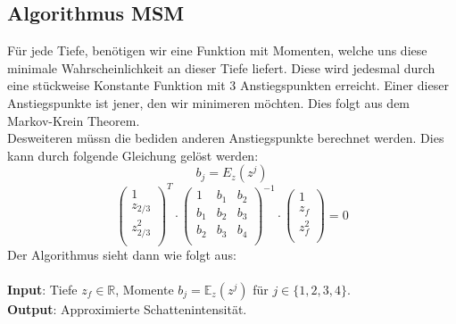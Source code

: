\documentclass[runningheaders,a4paper]{llncs}
\begin{document}
\subsection{Algorithmus MSM}
Für jede Tiefe, benötigen wir eine Funktion mit Momenten, welche uns diese minimale Wahrscheinlichkeit an dieser Tiefe liefert. Diese wird jedesmal durch eine stückweise Konstante Funktion mit 3 Anstiegspunkten erreicht. Einer dieser Anstiegspunkte ist jener, den wir minimeren möchten. Dies folgt aus dem Markov-Krein Theorem.\cite{msm}\\
Desweiteren müssn die bediden anderen Anstiegspunkte berechnet werden. Dies kann durch folgende Gleichung gelöst werden:
$$b_j = E_z(z^j)$$
$$\begin{pmatrix} 
1\\
z_{2/3}\\
z^2_{2/3}\\
\end{pmatrix}^T \cdot 
\begin{pmatrix}
1 & b_1 & b_2\\
b_1 & b_2 & b_3\\
b_2 & b_3 & b_4\\
\end{pmatrix}^{-1} \cdot
\begin{pmatrix}
1\\
z_f\\
z^2_f\\
\end{pmatrix} = 0
$$
Der Algorithmus sieht dann wie folgt aus:\\
\\
\textbf{Input}: Tiefe $z_f \in \mathbb{R}$, Momente $b_j = \mathbb{E}_z(z^j)$ für $j \in \{1,2,3,4\}$.\\
\textbf{Output}: Approximierte Schattenintensität.\\
\end{document}
